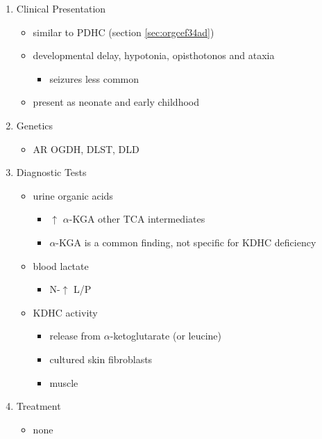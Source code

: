 \documentclass{scrartcl}
\begin{document}
\begin{enumerate}
\item Clinical Presentation
\label{sec:org4d017fd}
\begin{itemize}
\item similar to PDHC (section \ref{sec:orgcef34ad})
\item developmental delay, hypotonia, opisthotonos and ataxia
\begin{itemize}
\item seizures less common
\end{itemize}
\item present as neonate and early childhood
\end{itemize}

\item Genetics
\label{sec:org1def7c5}
\begin{itemize}
\item AR OGDH, DLST, DLD
\end{itemize}

\item Diagnostic Tests
\label{sec:orgb7ab629}
\begin{itemize}
\item urine organic acids
\begin{itemize}
\item \(\uparrow\) \(\alpha\)-KGA \textpm{} other TCA intermediates
\item \(\alpha\)-KGA is a common finding, not specific for KDHC deficiency
\end{itemize}
\item blood lactate
\begin{itemize}
\item N-\(\uparrow\) L/P
\end{itemize}
\item KDHC activity
\begin{itemize}
\item {} release from \ce{[1-^14C]} \(\alpha\)-ketoglutarate (or \ce{[1-^14C]} leucine)
\item cultured skin fibroblasts
\item muscle
\end{itemize}
\end{itemize}

\item Treatment
\label{sec:org9ba781b}
\begin{itemize}
\item none
\end{itemize}
\end{enumerate}
\end{document}
